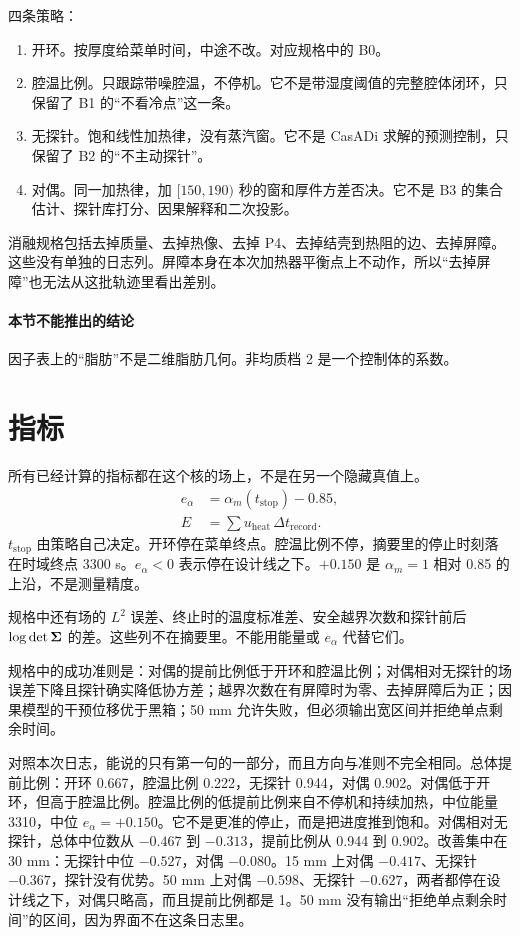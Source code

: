 四条策略：

\begin{enumerate}
\item 开环。按厚度给菜单时间，中途不改。对应规格中的 B0。
\item 腔温比例。只跟踪带噪腔温，不停机。它不是带湿度阈值的完整腔体闭环，只保留了 B1 的“不看冷点”这一条。
\item 无探针。饱和线性加热律，没有蒸汽窗。它不是 CasADi 求解的预测控制，只保留了 B2 的“不主动探针”。
\item 对偶。同一加热律，加 \([150,190)\) 秒的窗和厚件方差否决。它不是 B3 的集合估计、探针库打分、因果解释和二次投影。
\end{enumerate}

消融规格包括去掉质量、去掉热像、去掉 P4、去掉结壳到热阻的边、去掉屏障。这些没有单独的日志列。屏障本身在本次加热器平衡点上不动作，所以“去掉屏障”也无法从这批轨迹里看出差别。

\paragraph{本节不能推出的结论}
因子表上的“脂肪”不是二维脂肪几何。非均质档 2 是一个控制体的系数。

\section{指标}

所有已经计算的指标都在这个核的场上，不是在另一个隐藏真值上。
\begin{align}
e_{\alpha}&=\alpha_m(t_{\mathrm{stop}})-0.85,\\
E&=\sum u_{\mathrm{heat}}\,\Delta t_{\mathrm{record}}.
\end{align}
\(t_{\mathrm{stop}}\) 由策略自己决定。开环停在菜单终点。腔温比例不停，摘要里的停止时刻落在时域终点 3300 s。\(e_{\alpha}<0\) 表示停在设计线之下。\(+0.150\) 是 \(\alpha_m=1\) 相对 0.85 的上沿，不是测量精度。

规格中还有场的 \(L^2\) 误差、终止时的温度标准差、安全越界次数和探针前后 \(\log\det\bm{\Sigma}\) 的差。这些列不在摘要里。不能用能量或 \(e_{\alpha}\) 代替它们。

规格中的成功准则是：对偶的提前比例低于开环和腔温比例；对偶相对无探针的场误差下降且探针确实降低协方差；越界次数在有屏障时为零、去掉屏障后为正；因果模型的干预位移优于黑箱；50 mm 允许失败，但必须输出宽区间并拒绝单点剩余时间。

对照本次日志，能说的只有第一句的一部分，而且方向与准则不完全相同。总体提前比例：开环 0.667，腔温比例 0.222，无探针 0.944，对偶 0.902。对偶低于开环，但高于腔温比例。腔温比例的低提前比例来自不停机和持续加热，中位能量 3310，中位 \(e_{\alpha}=+0.150\)。它不是更准的停止，而是把进度推到饱和。对偶相对无探针，总体中位数从 \(-0.467\) 到 \(-0.313\)，提前比例从 0.944 到 0.902。改善集中在 30 mm：无探针中位 \(-0.527\)，对偶 \(-0.080\)。15 mm 上对偶 \(-0.417\)、无探针 \(-0.367\)，探针没有优势。50 mm 上对偶 \(-0.598\)、无探针 \(-0.627\)，两者都停在设计线之下，对偶只略高，而且提前比例都是 1。50 mm 没有输出“拒绝单点剩余时间”的区间，因为界面不在这条日志里。

